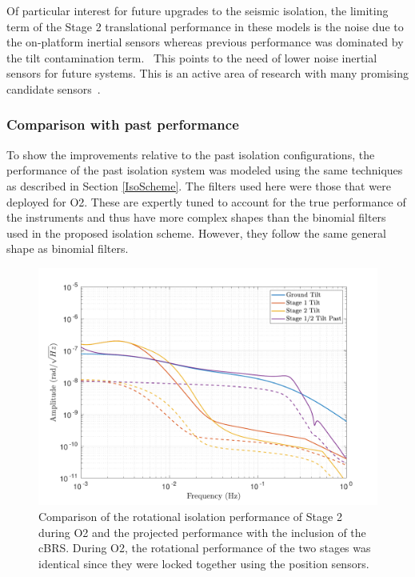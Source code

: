 \documentclass [12pt, proquest]{uwthesis}[2019]
\begin{document}
Of particular interest for future upgrades to the seismic isolation, the limiting term of the Stage 2 translational performance in these models is the noise due to the on-platform inertial sensors whereas previous performance was dominated by the tilt contamination term.~\cite{windproofing} This points to the need of lower noise inertial sensors for future systems. This is an active area of research with many promising candidate sensors~\cite{Mow_Lowry_2019, Cooper_2018}. 

\subsubsection{Comparison with past performance}

To show the improvements relative to the past isolation configurations, the performance of the past isolation system was modeled using the same techniques as described in Section \ref{IsoScheme}. The filters used here were those that were deployed for O2. These are expertly tuned to account for the true performance of the instruments and thus have more complex shapes than the binomial filters used in the proposed isolation scheme. However, they follow the same general shape as binomial filters.

\begin{figure}[!h]
\begin{center}
\includegraphics[width=\textwidth]{cBRS_Model_CompRX.pdf}
\caption[Comparison of the rotational isolation performance of Stage 2 during O2 and the projected performance with the inclusion of the cBRS]{Comparison of the rotational isolation performance of Stage 2 during O2 and the projected performance with the inclusion of the cBRS. During O2, the rotational performance of the two stages was identical since they were locked together using the position sensors.}
\label{cBRSCompR}
\end{center}
\end{figure}
\end{document}
